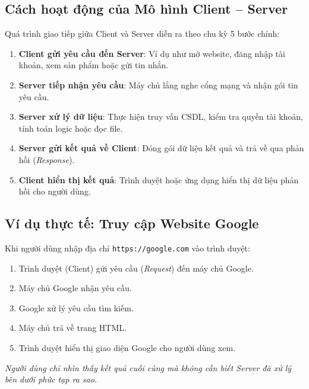 \documentclass[11pt,oneside]{book}
\newcommand{\codeinline}[1]{\textcolor{accentOrange}{\texttt{#1}}}
\begin{document}
\subsection{Cách hoạt động của Mô hình Client -- Server}

Quá trình giao tiếp giữa Client và Server diễn ra theo chu kỳ 5 bước chính:

\begin{conceptBox}
\begin{enumerate}[label=\textbf{\color{conceptBorder}Bước \arabic*:}, leftmargin=4.5em, itemsep=3pt, parsep=0pt, topsep=4pt]
    \item \textbf{Client gửi yêu cầu đến Server}: Ví dụ như mở website, đăng nhập tài khoản, xem sản phẩm hoặc gửi tin nhắn.
    \item \textbf{Server tiếp nhận yêu cầu}: Máy chủ lắng nghe cổng mạng và nhận gói tin yêu cầu.
    \item \textbf{Server xử lý dữ liệu}: Thực hiện truy vấn CSDL, kiểm tra quyền tài khoản, tính toán logic hoặc đọc file.
    \item \textbf{Server gửi kết quả về Client}: Đóng gói dữ liệu kết quả và trả về qua phản hồi (\textit{Response}).
    \item \textbf{Client hiển thị kết quả}: Trình duyệt hoặc ứng dụng hiển thị dữ liệu phản hồi cho người dùng.
\end{enumerate}
\end{conceptBox}

\subsection{Ví dụ thực tế: Truy cập Website Google}

Khi người dùng nhập địa chỉ \codeinline{https://google.com} vào trình duyệt:
\begin{enumerate}[label=\textbf{\color{primaryBlue}\arabic*.}, leftmargin=2em, itemsep=2pt, parsep=0pt, topsep=2pt]
    \item Trình duyệt (Client) gửi yêu cầu (\textit{Request}) đến máy chủ Google.
    \item Máy chủ Google nhận yêu cầu.
    \item Google xử lý yêu cầu tìm kiếm.
    \item Máy chủ trả về trang HTML.
    \item Trình duyệt hiển thị giao diện Google cho người dùng xem.
\end{enumerate}
\textit{Người dùng chỉ nhìn thấy kết quả cuối cùng mà không cần biết Server đã xử lý bên dưới phức tạp ra sao.}
\end{document}
